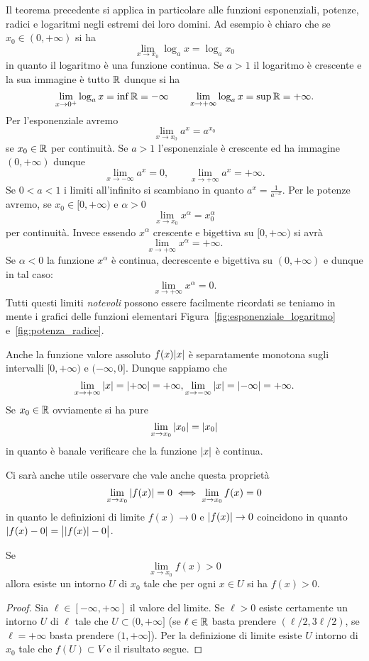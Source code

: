 Il teorema precedente si applica in particolare alle funzioni 
esponenziali, potenze, radici e logaritmi negli estremi dei loro 
domini. Ad esempio è chiaro che se $x_0\in (0,+\infty)$ 
si ha 
\[
  \lim_{x\to x_0} \log_a x = \log_a x_0
\]
in quanto il logaritmo è una funzione continua. 
Se $a>1$ il logaritmo è crescente e la sua immagine è tutto $\mathbb R$ 
dunque si ha 
\[
  \lim_{x\to 0^+} \log_a x = \inf \mathbb R = -\infty
  \qquad
  \lim_{x\to +\infty} \log_a x = \sup \mathbb R = +\infty.
\]
Per l'esponenziale avremo 
\[
 \lim_{x\to x_0} a^x = a^{x_0}
\]
se $x_0\in \mathbb R$ per continuità. 
Se $a>1$ l'esponenziale è crescente 
ed ha immagine $(0,+\infty)$ dunque 
\[
  \lim_{x\to -\infty} a^x = 0, \qquad 
  \lim_{x\to +\infty} a^x = +\infty.
\]
Se $0<a<1$ i limiti all'infinito 
si scambiano in quanto $a^{x}= \frac{1}{a^{-x}}$.
Per le potenze avremo, se $x_0\in[0,+\infty)$ e $\alpha>0$
\[
  \lim_{x\to x_0} x^\alpha = x_0^\alpha
\]
per continuità. Invece essendo $x^\alpha$ crescente e bigettiva 
su $[0,+\infty)$ si avrà 
\[
  \lim_{x\to +\infty} x^\alpha = +\infty.
\]
Se $\alpha<0$ la funzione $x^\alpha$ è continua, decrescente e bigettiva 
su $(0,+\infty)$ e dunque in tal caso:
\[
  \lim_{x\to +\infty} x^\alpha = 0.
\]
Tutti questi limiti \emph{notevoli} possono essere facilmente 
ricordati se teniamo in mente i grafici delle funzioni elementari
Figura~\ref{fig:esponenziale_logaritmo} e~\ref{fig:potenza_radice}.

Anche la funzione valore assoluto $f(x){\left|x\right|}$ è separatamente 
monotona sugli intervalli $[0,+\infty)$ e $(-\infty,0]$. 
Dunque sappiamo che 
\[
  \lim_{x\to +\infty} {\left|x\right|} = {\left|+\infty\right|} = +\infty, 
  \lim_{x\to -\infty} {\left|x\right|} = {\left|-\infty\right|} = +\infty.
\]
Se $x_0\in \mathbb R$ ovviamente si ha pure
\[
  \lim_{x\to x_0} {\left|x_0\right|} = {\left|x_0\right|}
\]
in quanto è banale verificare che la funzione ${\left|x\right|}$ è continua.

Ci sarà anche utile osservare che vale anche questa proprietà 
\[
\lim_{x\to x_0} {\left|f(x)\right|} = 0 \iff 
\lim_{x\to x_0} f(x) = 0
\]
in quanto le definizioni di limite $f(x)\to 0$ e ${\left|f(x)\right|}\to 0$ 
coincidono in quanto ${\left|f(x)-0\right|} = \big\lvert{{\left|f(x)\right|} - 0}\big\rvert$.

\begin{theorem}%
\mymark{***}%
%
%
%
Se
\[
  \lim_{x\to x_0} f(x) > 0
\]
allora esiste un intorno $U$ di $x_0$ tale che 
per ogni $x\in U$ si ha $f(x) > 0$.
\end{theorem}
%
\begin{proof}
Sia $\ell\in [-\infty,+\infty]$ il valore del limite.
Se $\ell>0$ esiste certamente un intorno $U$ di $\ell$ 
tale che $U\subset (0,+\infty]$ (se $\ell\in \mathbb R$ basta prendere 
$(\ell/2,3 \ell/2)$, se $\ell=+\infty$ basta prendere $(1,+\infty]$).
Per la definizione di limite esiste $U$ intorno di $x_0$ 
tale che $f(U)\subset V$ e il risultato segue.
\end{proof}

